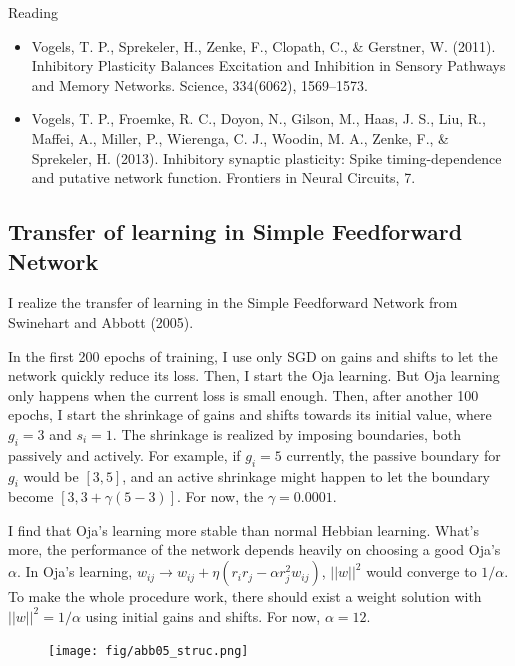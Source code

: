 \documentclass[12pt, a4paper]{article}
\begin{document}
\noindent
Reading

\begin{itemize}
    \item Vogels, T. P., Sprekeler, H., Zenke, F., Clopath, C., \& Gerstner, W. (2011). Inhibitory Plasticity Balances Excitation and Inhibition in Sensory Pathways and Memory Networks. Science, 334(6062), 1569–1573.
    \item Vogels, T. P., Froemke, R. C., Doyon, N., Gilson, M., Haas, J. S., Liu, R., Maffei, A., Miller, P., Wierenga, C. J., Woodin, M. A., Zenke, F., \& Sprekeler, H. (2013). Inhibitory synaptic plasticity: Spike timing-dependence and putative network function. Frontiers in Neural Circuits, 7.
\end{itemize}

\newpage

\subsection*{Transfer of learning in Simple Feedforward Network}

I realize the transfer of learning in the Simple Feedforward Network from Swinehart and Abbott (2005).

In the first 200 epochs of training, I use only SGD on gains and shifts to let the network quickly reduce its loss. Then, I start the Oja learning. But Oja learning only happens when the current loss is small enough.  Then, after another 100 epochs, I start the shrinkage of gains and shifts towards its initial value, where $g_i=3$ and $s_i=1$. The shrinkage is realized by imposing boundaries, both passively and actively. For example, if $g_i=5$ currently, the passive boundary for $g_i$ would be $[3,5]$, and an active shrinkage might happen to let the boundary become $[3,3+\gamma(5-3)]$. For now, the $\gamma=0.0001$.

I find that Oja's learning more stable than normal Hebbian learning. What's more, the performance of the network depends heavily on choosing a good Oja's $\alpha$. In Oja's learning, $w_{ij} \rightarrow w_{ij} + \eta (r_i r_j - \alpha r_j^2 w_{ij})$, $||w||^2$ would converge to $1/\alpha$. To make the whole procedure work, there should exist a weight solution with $||w||^2=1/\alpha$ using initial gains and shifts. For now, $\alpha=12$.

\begin{figure}[H]
    \centering
    \texttt{[image: fig/abb05\_struc.png]}
    \label{fig:1}
\end{figure}
\end{document}
